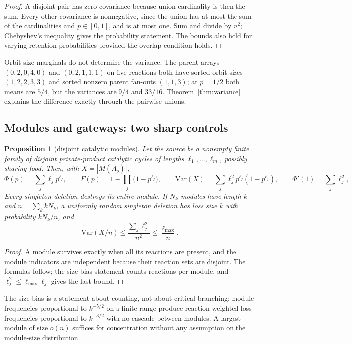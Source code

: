 \documentclass[11pt,a4paper]{article}
\theoremstyle{plain}
\newtheorem{proposition}[theorem]{Proposition}
\theoremstyle{definition}
\theoremstyle{remark}
\newcommand{\Var}{\mathrm{Var}}
\begin{document}
\begin{proof}
A disjoint pair has zero covariance because union cardinality is then the sum. Every other covariance is nonnegative, since the union has at most the sum of the cardinalities and $p\in[0,1]$, and is at most one. Sum and divide by $n^{2}$; Chebyshev's inequality gives the probability statement. The bounds also hold for varying retention probabilities provided the overlap condition holds.
\end{proof}

Orbit-size marginals do not determine the variance. The parent arrays $(0,2,0,4,0)$ and $(0,2,1,1,1)$ on five reactions both have sorted orbit sizes $(1,2,2,3,3)$ and sorted nonzero parent fan-outs $(1,1,3)$; at $p=1/2$ both means are $5/4$, but the variances are $9/4$ and $33/16$. Theorem~\ref{thm:variance} explains the difference exactly through the pairwise unions.

\subsection{Modules and gateways: two sharp controls}

\begin{proposition}[disjoint catalytic modules]\label{prop:modules}
Let the source be a nonempty finite family of disjoint private-product catalytic cycles of lengths $\ell_1,\dots,\ell_m$, possibly sharing food. Then, with $X=|M(A_p)|$,
\[
\Phi(p)=\sum_j\ell_jp^{\ell_j},\qquad F(p)=1-\prod_j\big(1-p^{\ell_j}\big),\qquad
\Var(X)=\sum_j\ell_j^{2}p^{\ell_j}(1-p^{\ell_j}),\qquad \Phi'(1)=\sum_j\ell_j^{2},
\]
Every singleton deletion destroys its entire module. If $N_k$ modules have length $k$ and $n=\sum_kkN_k$, a uniformly random singleton deletion has loss size $k$ with probability $kN_k/n$, and
\[
\Var(X/n)\le\frac{\sum_j\ell_j^{2}}{n^{2}}\le\frac{\ell_{\max}}{n}.
\]
\end{proposition}

\begin{proof}
A module survives exactly when all its reactions are present, and the module indicators are independent because their reaction sets are disjoint. The formulas follow; the size-bias statement counts reactions per module, and $\ell_j^{2}\le\ell_{\max}\ell_j$ gives the last bound.
\end{proof}

The size bias is a statement about counting, not about critical branching: module frequencies proportional to $k^{-5/2}$ on a finite range produce reaction-weighted loss frequencies proportional to $k^{-3/2}$ with no cascade between modules. A largest module of size $o(n)$ suffices for concentration without any assumption on the module-size distribution.
\end{document}
